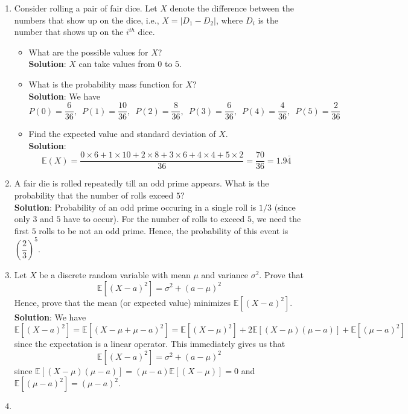 \documentclass{article}
\newcommand{\abs}[1]{\displaystyle\left\lvert#1\right\rvert}
\newcommand{\Eb}{\mathbb{E}}
\newcommand{\bkt}[1]{\left(#1\right)}
\newcommand{\soln}[1]{\textbf{Solution}:#1}
\begin{document}
\begin{enumerate}
\begin{enumerate}[i]
{			}
		\end{enumerate}
		\item
		Consider rolling a pair of fair dice. Let $X$ denote the difference between the numbers that show up on the dice, i.e., $X = \abs{D_1-D_2}$, where $D_i$ is the number that shows up on the $i^{th}$ dice.
		\begin{itemize}
			\item
			What are the possible values for $X$?\\
			\soln{
			$X$ can take values from $0$ to $5$.
			}
			\item
			What is the probability mass function for $X$?\\
			\soln{
			We have
			$$P(0) = \dfrac{6}{36},\,\,\, P(1) = \dfrac{10}{36},\,\,\, P(2) = \dfrac{8}{36},\,\,\, P(3) = \dfrac{6}{36},\,\,\, P(4) = \dfrac{4}{36},\,\,\, P(5) = \dfrac{2}{36}$$
			}
			\item
			Find the expected value and standard deviation of $X$.\\
			\soln{
			$$\Eb\bkt{X} = \dfrac{0 \times 6 + 1 \times 10 + 2 \times 8+ 3 \times 6 + 4 \times 4 + 5 \times 2}{36} = \dfrac{70}{36} = 1.9 \bar{4}$$
			}
		\end{itemize}
		\item
		A fair die is rolled repeatedly till an odd prime appears. What is the probability that the number of rolls exceed $5$?\\
		\soln{
		Probability of an odd prime occuring in a single roll is $1/3$ (since only $3$ and $5$ have to occur). For the number of rolls to exceed $5$, we need the first $5$ rolls to be not an odd prime. Hence, the probability of this event is $\bkt{\dfrac23}^5$.
		}
		\item
		Let $X$ be a discrete random variable with mean $\mu$ and variance $\sigma^2$. Prove that
		$$\mathbb{E}\left[\bkt{X-a}^2\right] = \sigma^2 + \bkt{a-\mu}^2$$
		Hence, prove that the mean (or expected value) minimizes $\mathbb{E}\left[\bkt{X-a}^2\right]$.\\
		\soln{
		We have
		$$\Eb\left[\bkt{X-a}^2\right] = \Eb\left[\bkt{X-\mu + \mu - a}^2\right] = \Eb\left[\bkt{X-\mu}^2\right] + 2\Eb\left[\bkt{X-\mu} \bkt{\mu-a}\right] + \Eb\left[\bkt{\mu-a}^2\right]$$
		since the expectation is a linear operator.
		This immediately gives us that
		$$\mathbb{E}\left[\bkt{X-a}^2\right] = \sigma^2 + \bkt{a-\mu}^2$$
		since $\Eb\left[\bkt{X-\mu} \bkt{\mu-a}\right] = \bkt{\mu-a}\Eb\left[\bkt{X-\mu}\right] = 0$ and $\Eb\left[\bkt{\mu-a}^2\right] = \bkt{\mu-a}^2$.
		}
		\item

\end{enumerate}
\end{document}
